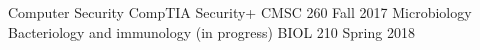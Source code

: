 \begin{cvdiwrapper}

  \cvdateitem
    {Computer Security} %
    {CompTIA Security+} %
    {CMSC 260} %
    {Fall 2017} %
   \cvdateitem
    {Microbiology} %
    {Bacteriology and immunology (in progress)} %
    {BIOL 210} %
    {Spring 2018} %

\end{cvdiwrapper}


